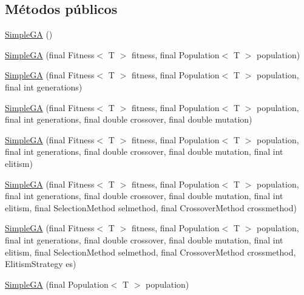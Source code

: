 \subsection*{Métodos públicos}
\begin{DoxyCompactItemize}
\item 
\hyperlink{classjenes_1_1algorithms_1_1_simple_g_a_3_01_t_01extends_01_chromosome_01_4_a706a621e21564095963264fdfd2eba32}{Simple\-G\-A} ()
\item 
\hyperlink{classjenes_1_1algorithms_1_1_simple_g_a_3_01_t_01extends_01_chromosome_01_4_a44ee069daad5aaed809b2d83303052e0}{Simple\-G\-A} (final Fitness$<$ T $>$ fitness, final Population$<$ T $>$ population)
\item 
\hyperlink{classjenes_1_1algorithms_1_1_simple_g_a_3_01_t_01extends_01_chromosome_01_4_acbdaae378fd9263001e6393cb132bda4}{Simple\-G\-A} (final Fitness$<$ T $>$ fitness, final Population$<$ T $>$ population, final int generations)
\item 
\hyperlink{classjenes_1_1algorithms_1_1_simple_g_a_3_01_t_01extends_01_chromosome_01_4_a9382ccbfaed16b3dbf4feeb23afa71e8}{Simple\-G\-A} (final Fitness$<$ T $>$ fitness, final Population$<$ T $>$ population, final int generations, final double crossover, final double mutation)
\item 
\hyperlink{classjenes_1_1algorithms_1_1_simple_g_a_3_01_t_01extends_01_chromosome_01_4_ae4d2d54f7d376688e0ab0eabfa85a7e2}{Simple\-G\-A} (final Fitness$<$ T $>$ fitness, final Population$<$ T $>$ population, final int generations, final double crossover, final double mutation, final int elitism)
\item 
\hyperlink{classjenes_1_1algorithms_1_1_simple_g_a_3_01_t_01extends_01_chromosome_01_4_aeb160f73fc3a8937c7d8da9140f57e38}{Simple\-G\-A} (final Fitness$<$ T $>$ fitness, final Population$<$ T $>$ population, final int generations, final double crossover, final double mutation, final int elitism, final Selection\-Method selmethod, final Crossover\-Method crossmethod)
\item 
\hyperlink{classjenes_1_1algorithms_1_1_simple_g_a_3_01_t_01extends_01_chromosome_01_4_ada2d647b3a202f4e6bb7d1b1c894791b}{Simple\-G\-A} (final Fitness$<$ T $>$ fitness, final Population$<$ T $>$ population, final int generations, final double crossover, final double mutation, final int elitism, final Selection\-Method selmethod, final Crossover\-Method crossmethod, Elitism\-Strategy es)
\item 
\hyperlink{classjenes_1_1algorithms_1_1_simple_g_a_3_01_t_01extends_01_chromosome_01_4_a3f8162d093934286fd3963580f380d9a}{Simple\-G\-A} (final Population$<$ T $>$ population)

\end{DoxyCompactItemize}
